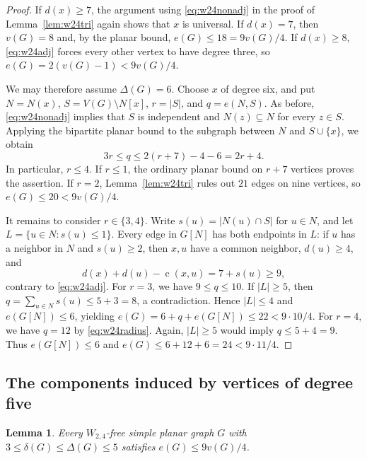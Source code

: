 \documentclass[11pt,a4paper]{article}
\newtheorem{lemma}[theorem]{Lemma}
\theoremstyle{remark}
\newcommand{\cdeg}{\operatorname{c}}
\begin{document}
\begin{proof}
If $d(x)\geq7$, the argument using \eqref{eq:w24nonadj} in the proof of
Lemma~\ref{lem:w24tri} again shows that $x$ is universal. If $d(x)=7$,
then $v(G)=8$ and, by the planar bound, $e(G)\leq18=9v(G)/4$.
If $d(x)\geq8$, \eqref{eq:w24adj} forces every other vertex to have
degree three, so $e(G)=2(v(G)-1)<9v(G)/4$.

We may therefore assume $\Delta(G)=6$. Choose $x$ of degree six, and put
$N=N(x)$, $S=V(G)\setminus N[x]$, $r=|S|$, and $q=e(N,S)$.
As before, \eqref{eq:w24nonadj} implies that $S$ is independent and
$N(z)\subseteq N$ for every $z\in S$. Applying the bipartite planar bound to the subgraph
between $N$ and $S\cup\{x\}$, we obtain
\begin{equation}\label{eq:w24radius}
 3r\leq q\leq2(r+7)-4-6=2r+4.
\end{equation}
In particular, $r\leq4$. If $r\leq1$, the ordinary planar bound on
$r+7$ vertices proves the assertion. If $r=2$,
Lemma~\ref{lem:w24tri} rules out $21$ edges on nine vertices, so
$e(G)\leq20<9v(G)/4$.

It remains to consider $r\in\{3,4\}$. Write $s(u)=|N(u)\cap S|$ for
$u\in N$, and let $L=\{u\in N:s(u)\leq1\}$. Every edge in $G[N]$ has
both endpoints in $L$: if $u$ has a neighbor in $N$ and $s(u)\geq2$,
then $x,u$ have a common neighbor, $d(u)\geq4$, and
\[
 d(x)+d(u)-\cdeg(x,u)=7+s(u)\geq9,
\]
contrary to \eqref{eq:w24adj}.
For $r=3$, we have $9\leq q\leq10$. If $|L|\geq5$, then
$q=\sum_{u\in N}s(u)\leq5+3=8$, a contradiction. Hence $|L|\leq4$
and $e(G[N])\leq6$, yielding $e(G)=6+q+e(G[N])\leq22<9\cdot10/4$.
For $r=4$, we have $q=12$ by \eqref{eq:w24radius}. Again, $|L|\geq5$ would
imply $q\leq5+4=9$. Thus $e(G[N])\leq6$ and
$e(G)\leq6+12+6=24<9\cdot11/4$.
\end{proof}

\subsection{The components induced by vertices of degree five}

\begin{lemma}\label{lem:w24bounded}
Every $W_{2,4}$-free simple planar graph $G$ with
$3\leq\delta(G)\leq\Delta(G)\leq5$ satisfies $e(G)\leq9v(G)/4$.
\end{lemma}
\end{document}
